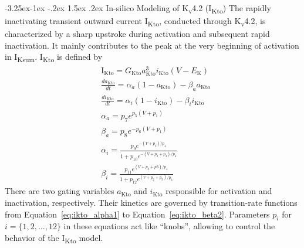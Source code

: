 \documentclass[11pt]{article}
\makeatletter
\renewcommand\subsubsection{\@startsection{subsubsection}{3}{\z@}%
                                    {-3.25ex\@plus -1ex \@minus -.2ex}%
                                     {1.5ex \@plus .2ex}%
                                     {\normalfont\normalsize\fontfamily{phv}\fontsize{14}{17}\selectfont}}
\makeatother
\begin{document}
\subsubsection{In-silico Modeling of K\textsubscript{v}4.2 (I\textsubscript{Kto})}
The rapidly inactivating transient outward current I\textsubscript{Kto}, conducted through K\textsubscript{v}4.2, is characterized by a sharp upstroke during activation and subsequent rapid inactivation. It mainly contributes to the peak at the very beginning of activation in I\textsubscript{Ksum}. I\textsubscript{Kto} is defined by
\begin{align}
    &\mathrm{I}_{\mathrm{Kto}} = G_{\mathrm{Kto}}a_{\mathrm{Kto}}^{3}i_{\mathrm{Kto}}(V-E_{\mathrm{K}}) \\
    &\frac{da_{\mathrm{Kto}}}{dt} = \alpha_{a}(1-a_{\mathrm{Kto}}) - \beta_{a}a_{\mathrm{Kto}} \\
    &\frac{di_{\mathrm{Kto}}}{dt} = \alpha_{i}(1-i_{\mathrm{Kto}}) - \beta_{i}i_{\mathrm{Kto}} \\
    &\alpha_{a} = p_{7}e^{p_{5}(V+p_{1})} \label{eq:ikto_alpha1} \\
    &\beta_{a}= p_{8}e^{-p_6(V+p_{1})} \\
    &\alpha_{i} = \frac{p_{9}e^{-(V+p_{2})/p_{4}}}{1+p_{10}e^{-(V+p_{2}+p_{3})/p_{4}}} \\
    & \beta_{i} = \frac{p_{11}e^{(V+p_{2}+p{3})/p_{4}}}{1+p_{12}e^{(V+p_{2}+p_{3})/p_{4}}} \label{eq:ikto_beta2}
\end{align}
There are two gating variables $a_{\mathrm{Kto}}$ and $i_{\mathrm{Kto}}$ responsible for activation and inactivation, respectively. Their kinetics are governed by transition-rate functions from Equation~\ref{eq:ikto_alpha1} to Equation~\ref{eq:ikto_beta2}. Parameters $p_{i}$ for $i=\{1, 2, \dots, 12\}$ in these equations act like ``knobs'', allowing to control the behavior of the I\textsubscript{Kto} model.
\end{document}
